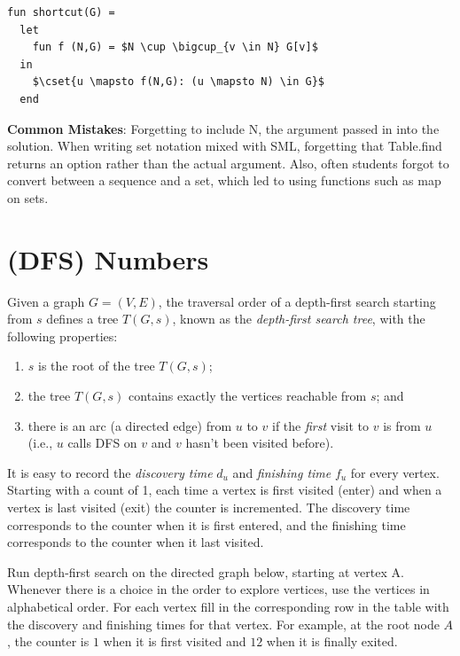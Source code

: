 \begin{problem}
\begin{lstlisting}[numbers=none]
fun shortcut(G) = 
  let 
    fun f (N,G) = $N \cup \bigcup_{v \in N} G[v]$
  in   
    $\cset{u \mapsto f(N,G): (u \mapsto N) \in G}$
  end
\end{lstlisting}

\notes
\textbf{Common Mistakes}: Forgetting to include N, the argument passed in into the solution. When writing set notation mixed with SML, forgetting that Table.find returns an option rather than the actual argument. Also, often students forgot to convert between a sequence and a set, which led to using functions such as map on sets.

\end{problem}



\section{(DFS) Numbers}

Given a graph $G = (V,E)$, the traversal order of a depth-first search starting
from $s$ defines a tree $T(G, s)$, known as the \emph{depth-first search tree},
with the following properties:
\begin{enumerate}[itemsep=2pt,topsep=0pt,label=(\roman*),
  labelindent=2\parindent,
  leftmargin=*]
\item $s$ is the root of the tree $T(G,s)$;
\item the tree $T(G,s)$ contains exactly the vertices reachable from $s$; and
\item there is an arc (a directed edge) from $u$ to $v$ if the
  \emph{first} visit to $v$ is
from $u$ (i.e., $u$ calls DFS on $v$ and $v$ hasn't been visited before).
\end{enumerate}

It is easy to record the \emph{discovery time} $d_u$ and
\emph{finishing time} $f_u$ for every vertex.  Starting with a count
of 1, each time a vertex is
first visited (enter) and when a vertex is
last visited (exit) the counter is incremented.  The discovery time
corresponds to the counter when it is first entered, and the finishing
time corresponds to the counter when it last visited.



Run depth-first search on the directed graph below, starting at vertex
A. Whenever there is a choice in the order to explore vertices, use
the vertices in alphabetical order.
For each vertex fill in the corresponding row in the
table with the discovery and finishing
times for that vertex. For example, at the root node $A$, the
counter is $1$ when it is first visited and $12$ when it is finally exited.




